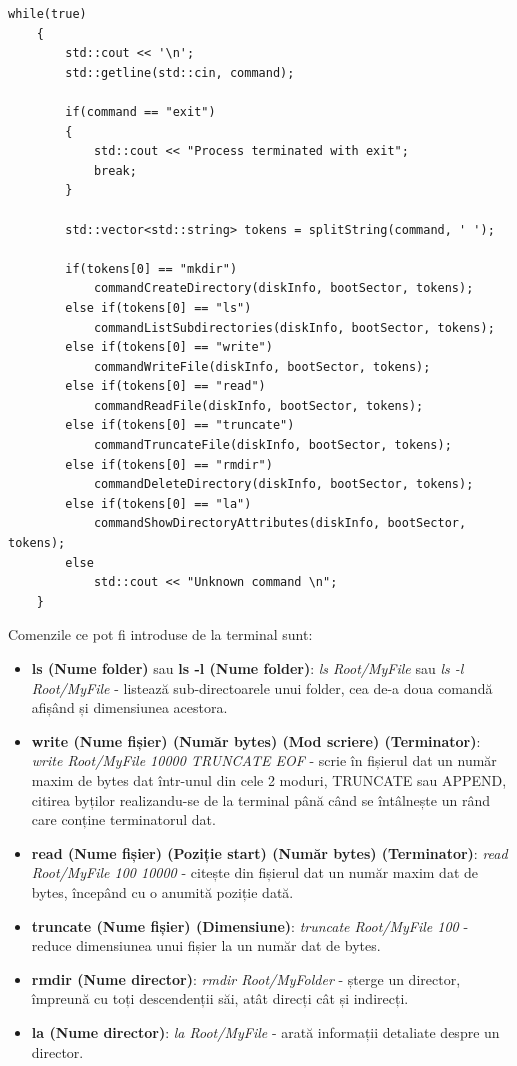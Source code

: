 \bigskip

\lstset{style=code-snyppet-style}
\begin{lstlisting}
while(true)
    {
        std::cout << '\n';
        std::getline(std::cin, command);

        if(command == "exit")
        {
            std::cout << "Process terminated with exit";
            break;
        }

        std::vector<std::string> tokens = splitString(command, ' ');

        if(tokens[0] == "mkdir")
            commandCreateDirectory(diskInfo, bootSector, tokens);
        else if(tokens[0] == "ls")
            commandListSubdirectories(diskInfo, bootSector, tokens);
        else if(tokens[0] == "write")
            commandWriteFile(diskInfo, bootSector, tokens);
        else if(tokens[0] == "read")
            commandReadFile(diskInfo, bootSector, tokens);
        else if(tokens[0] == "truncate")
            commandTruncateFile(diskInfo, bootSector, tokens);
        else if(tokens[0] == "rmdir")
            commandDeleteDirectory(diskInfo, bootSector, tokens);
        else if(tokens[0] == "la")
            commandShowDirectoryAttributes(diskInfo, bootSector, tokens);
        else
            std::cout << "Unknown command \n";
    }
\end{lstlisting}

\bigskip

Comenzile ce pot fi introduse de la terminal sunt:

\begin{itemize}
  \item \textbf{ls (Nume folder)} sau \textbf{ls -l (Nume folder)}: \textit{ls Root/MyFile} sau \textit{ls -l Root/MyFile} - listează sub-directoarele unui folder, cea de-a doua comandă afișând și dimensiunea acestora.

  \item \textbf{write (Nume fișier) (Număr bytes) (Mod scriere) (Terminator)}: \textit{write Root/MyFile 10000 TRUNCATE EOF} - scrie în fișierul dat un număr maxim de bytes dat într-unul din cele 2 moduri, TRUNCATE sau APPEND, citirea byților realizandu-se de la terminal până când se întâlnește un rând care conține terminatorul dat.

  \item \textbf{read (Nume fișier) (Poziție start) (Număr bytes) (Terminator)}: \textit{read Root/MyFile 100 10000} - citește din fișierul dat un număr maxim dat de bytes, începând cu o anumită poziție dată.

  \item \textbf{truncate (Nume fișier) (Dimensiune)}: \textit{truncate Root/MyFile 100} - reduce dimensiunea unui fișier la un număr dat de bytes.

  \item \textbf{rmdir (Nume director)}: \textit{rmdir Root/MyFolder} - șterge un director, împreună cu toți descendenții săi, atât direcți cât și indirecți.

  \item \textbf{la (Nume director)}: \textit{la Root/MyFile} - arată informații detaliate despre un director.
\end{itemize}


